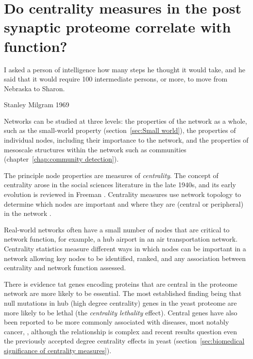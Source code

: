\chapter{Do centrality measures in the post synaptic proteome correlate with function?}
\label{chap:Centrality measures}

 \begin{displayquote}
 I asked a person of intelligence how many steps he thought it would take, and he said that it would require 100 intermediate persons, or more, to move from Nebraska to Sharon. \cite{milgram1967small}
 
 Stanley Milgram 1969
\end{displayquote}


 

Networks can be studied at three levels: the properties of the network as a whole, such as the small-world property (section~\ref{sec:Small world}), the properties of individual nodes, including their importance to the network, and the properties of mesoscale structures within the network such as communities (chapter~\ref{chap:community detection}).
  
  The principle node properties are measures of \textit{centrality}. The concept of centrality arose in the social sciences literature in the late 1940s, and its early evolution is reviewed in Freeman \cite{freeman1978centrality}. Centrality measures use network topology to determine which nodes are important \cite{newman2018networks} and where they are (central or peripheral) in the network \cite{freeman1978centrality}. 

Real-world networks often have a small number of nodes that are critical to network function, for example, a hub airport in an air transportation network\cite{borenstein1989hubs}. Centrality statistics measure different ways in which nodes can be important in a network allowing key nodes to be identified, ranked, and any association between centrality and network function assessed. 
 
There is evidence tat genes encoding proteins that are central in the proteome network are more likely to be essential. The most established finding being that null mutations in hub (high degree centrality) genes in the yeast proteome are more likely to be lethal (the \textit{centrality lethality} effect)\cite{jeong2001lethality}. Central genes have also been reported to be more commonly associated with diseases, most notably cancer\cite{vogelstein2000surfing}, \cite{albert2005scale},\cite{xu2006discovering} although the relationship is complex and recent results question even the previously accepted degree centrality effects in yeast (section~\ref{sec:biomedical significance of centrality measures}).

